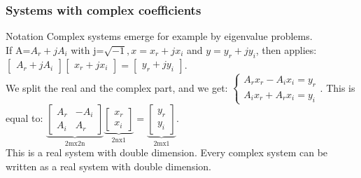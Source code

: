 \begin{frame}
	\frametitle{Systems with complex coefficients}
	\begin{block}{Notation}
		Complex systems emerge for example by eigenvalue problems.\\
		If A=$A_r+jA_i$ with j=$\sqrt{-1}, x=x_r+jx_i$ and $y=y_r+jy_i$, then applies: $\begin{bmatrix}
			A_r+jA_i
		\end{bmatrix}\begin{bmatrix}
		x_r+jx_i
		\end{bmatrix}=\begin{bmatrix}
		y_r+jy_i
		\end{bmatrix}$. \\
		We split the real and the complex part, and we get: $\begin{cases}
		A_rx_r-A_ix_i=y_r\\
		A_ix_r+A_rx_i=y_i
		\end{cases}$. This is equal to: $\underbrace{\begin{bmatrix}
		A_r & -A_i\\
		A_i & A_r
		\end{bmatrix}}_\text{2mx2n}\underbrace{\begin{bmatrix}
		x_r\\x_i
		\end{bmatrix}}_\text{2nx1}=\underbrace{\begin{bmatrix}
		y_r\\y_i
		\end{bmatrix}}_\text{2mx1}$.\\
	This is a real system with double dimension. Every complex system can be written as a real system with double dimension.
	\end{block}
\end{frame}

